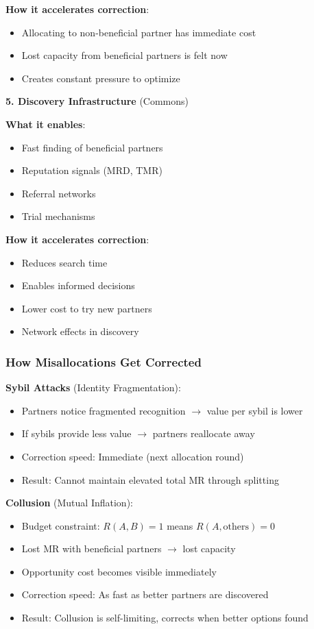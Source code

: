 \documentclass[11pt,a4paper]{article}
\theoremstyle{definition}
\theoremstyle{remark}
\begin{document}
\textbf{How it accelerates correction}:
\begin{itemize}
\item Allocating to non-beneficial partner has immediate cost
\item Lost capacity from beneficial partners is felt now
\item Creates constant pressure to optimize
\end{itemize}

\textbf{5. Discovery Infrastructure} (Commons)

\textbf{What it enables}:
\begin{itemize}
\item Fast finding of beneficial partners
\item Reputation signals (MRD, TMR)
\item Referral networks
\item Trial mechanisms
\end{itemize}

\textbf{How it accelerates correction}:
\begin{itemize}
\item Reduces search time
\item Enables informed decisions
\item Lower cost to try new partners
\item Network effects in discovery
\end{itemize}

\subsubsection{How Misallocations Get Corrected}

\textbf{Sybil Attacks} (Identity Fragmentation):
\begin{itemize}
\item Partners notice fragmented recognition $\rightarrow$ value per sybil is lower
\item If sybils provide less value $\rightarrow$ partners reallocate away
\item Correction speed: Immediate (next allocation round)
\item Result: Cannot maintain elevated total MR through splitting
\end{itemize}

\textbf{Collusion} (Mutual Inflation):
\begin{itemize}
\item Budget constraint: $R(A,B)=1$ means $R(A,\text{others})=0$
\item Lost MR with beneficial partners $\rightarrow$ lost capacity
\item Opportunity cost becomes visible immediately
\item Correction speed: As fast as better partners are discovered
\item Result: Collusion is self-limiting, corrects when better options found
\end{itemize}
\end{document}
